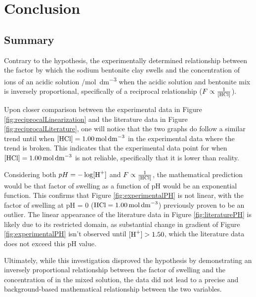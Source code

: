\documentclass[11pt, letterpaper]{article}
\begin{document}
\section{Conclusion}

\subsection{Summary}

Contrary to the hypothesis, the experimentally determined relationship
between the factor by which the sodium bentonite clay swells
and the concentration of  ions of an acidic solution /\unit{mol.dm^{-3}}
when the acidic solution and bentonite mix is inversely proportional, specifically
of a reciprocal relationship (\(F \propto \frac{1}{\ce{[HCl]}}\)).


Upon closer comparison between the experimental data in Figure \ref*{fig:reciprocalLinearization}
and the literature data in Figure \ref*{fig:reciprocalLiterature},
one will notice that the two graphs do follow a similar trend
until when \(\ce{[HCl]} = \SI{1.00}{mol.dm^{-3}}\) in the
experimental data where the trend is broken. This indicates
that the experimental data point for when \(\ce{[HCl]} = \SI{1.00}{mol.dm^{-3}}\)
is not reliable, specifically that it is lower than reality.

Considering both \(pH = -\log [\ce{H+}]\) and \(F \propto \frac{1}{\ce{[HCl]}}\),
the mathematical prediction would be that factor of swelling as a
function of pH would be an exponential function. This confirms
that Figure \ref*{fig:experimentalPH} is not linear, with
the factor of swelling at pH = 0 (\(\ce{HCl} = \SI{1.00}{mol.dm^{-3}}\))
previously proven to be an outlier. The linear appearance of the literature
data in Figure \ref*{fig:literaturePH} is likely due to its
restricted domain, as substantial change in gradient
of Figure \ref*{fig:experimentalPH} isn't observed
until \(\ce{[H+]} > 1.50\), which the literature data does not
exceed this pH value.

Ultimately, while this investigation disproved the hypothesis
by demonstrating an inversely proportional relationship between
the factor of swelling and the concentration of  in the
mixed solution, the data did not lead to a precise and
background-based mathematical relationship between the
two variables.
\end{document}
